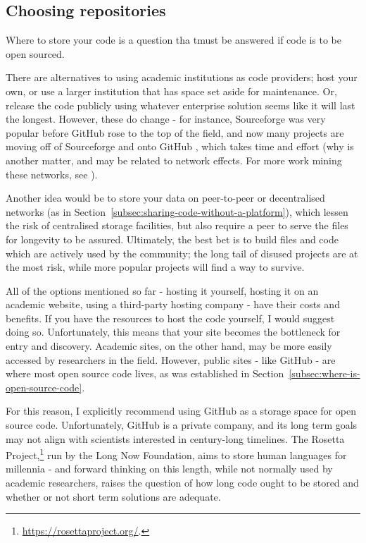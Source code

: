 \subsection{Choosing repositories}
\label{choosing-repositories}

Where to store your code is a question tha tmust be answered if code is to be open sourced.

There are alternatives to using academic institutions as code providers; host your own, or use a larger institution that has space set aside for maintenance. Or, release the code publicly using whatever enterprise solution seems like it will last the longest. However, these do change - for instance, Sourceforge was very popular before GitHub rose to the top of the field, and now many projects are moving off of Sourceforge and onto GitHub \citep{finley2011github}, which takes time and effort (why is another matter, and may be related to network effects. For more work mining these networks, see \citet{thung2013network, kalliamvakou2014promises}).

Another idea would be to store your data on peer-to-peer or decentralised networks (as in Section~\ref{subsec:sharing-code-without-a-platform}), which lessen the risk of centralised storage facilities, but also require a peer to serve the files for longevity to be assured. Ultimately, the best bet is to build files and code which are actively used by the community; the long tail of disused projects are at the most risk, while more popular projects will find a way to survive.

All of the options mentioned so far - hosting it yourself, hosting it on an academic website, using a third-party hosting company - have their costs and benefits. If you have the resources to host the code yourself, I would suggest doing so. Unfortunately, this means that your site becomes the bottleneck for entry and discovery. Academic sites, on the other hand, may be more easily accessed by researchers in the field. However, public sites - like GitHub - are where most open source code lives, as was established in Section~\ref{subsec:where-is-open-source-code}.

For this reason, I explicitly recommend using GitHub as a storage space for open source code. Unfortunately, GitHub is a private company, and its long term goals may not align with scientists interested in century-long timelines. The Rosetta Project,\footnote{\href{https://rosettaproject.org/}{https://rosettaproject.org/}. } run by the Long Now Foundation, aims to store human languages for millennia - and forward thinking on this length, while not normally used by academic researchers, raises the question of how long code ought to be stored and whether or not short term solutions are adequate.

